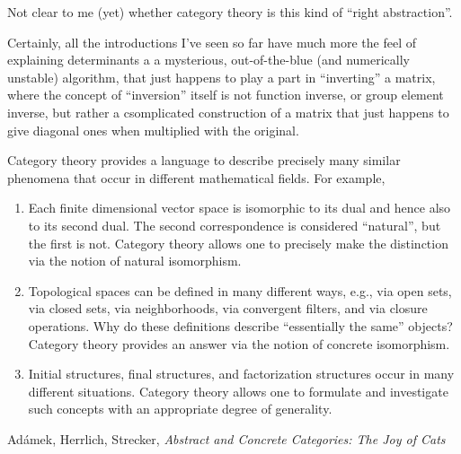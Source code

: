 \documentclass[11pt,openany]{article}
\begin{document}
Not clear to me (yet) whether category theory is this kind of
``right abstraction''. 

Certainly, all the introductions I've seen so far have much more
the feel of explaining determinants a a mysterious,
out-of-the-blue (and numerically unstable) algorithm,
that just happens to play a part in ``inverting'' a matrix,
where the concept of ``inversion'' itself is not 
function inverse, or group element inverse,
but rather a csomplicated construction of a matrix that
just happens to give diagonal ones when multiplied with 
the original.

\setcounter{currentlevel}{\value{baseSectionLevel}}
\label{sec:Why?}

\setlength{\epigraphwidth}{0.95\linewidth}

\epigraph{Category theory provides a language to describe precisely many similar phenomena that
occur in different mathematical fields. For example,
\begin{enumerate}
  \item  Each finite dimensional vector space is isomorphic to its dual and hence also to its
second dual. The second correspondence is considered “natural”, but the first is
not. Category theory allows one to precisely make the distinction via the notion
of natural isomorphism.
\item Topological spaces can be defined in many different ways, e.g., via open sets, via
closed sets, via neighborhoods, via convergent filters, and via closure operations.
Why do these definitions describe “essentially the same” objects? Category theory
provides an answer via the notion of concrete isomorphism.
\item Initial structures, final structures, and factorization structures occur in many different
situations. Category theory allows one to formulate and investigate such
concepts with an appropriate degree of generality.
\end{enumerate}
\leavevmode }
{Ad\'{a}mek, Herrlich, Strecker, 
\textit{Abstract and Concrete Categories:
The Joy of Cats}~\cite{adamek-herrlich-strecker-1990}}

\pagebreak
\end{document}
